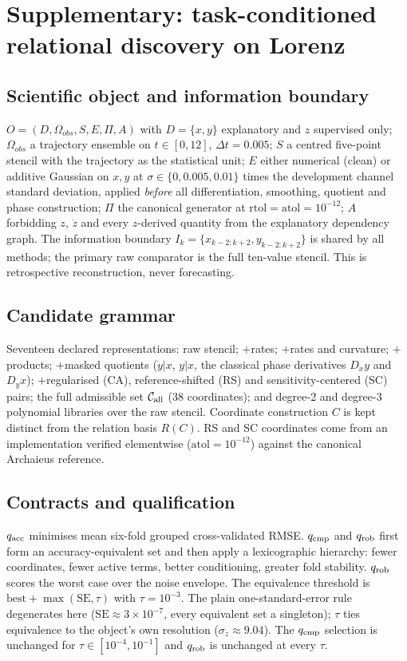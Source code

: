 
\section{Supplementary: task-conditioned relational discovery on Lorenz}

\subsection{Scientific object and information boundary}
$O=(D,\Omega_{obs},S,E,\Pi,A)$ with $D=\{x,y\}$ explanatory and $z$ supervised
only; $\Omega_{obs}$ a trajectory ensemble on $t\in[0,12]$, $\Delta t=0.005$;
$S$ a centred five-point stencil with the trajectory as the statistical unit;
$E$ either numerical (clean) or additive Gaussian on $x,y$ at
$\sigma\in\{0,0.005,0.01\}$ times the development channel standard deviation,
applied \emph{before} all differentiation, smoothing, quotient and phase
construction; $\Pi$ the canonical generator at $\mathrm{rtol}=\mathrm{atol}=10^{-12}$;
$A$ forbidding $z$, $\dot z$ and every $z$-derived quantity from the explanatory
dependency graph. The information boundary
$I_k=\{x_{k-2:k+2},y_{k-2:k+2}\}$ is shared by all methods; the primary raw
comparator is the full ten-value stencil. This is retrospective reconstruction,
never forecasting.

\subsection{Candidate grammar}
Seventeen declared representations: raw stencil; $+$rates; $+$rates and
curvature; $+$products; $+$masked quotients ($\dot y|x$, $y|x$, the classical
phase derivatives $D_x y$ and $D_y x$); $+$regularised (CA), reference-shifted
(RS) and sensitivity-centered (SC) pairs; the full admissible set
$\mathcal{C}_{\rm all}$ (38 coordinates); and degree-2 and degree-3 polynomial
libraries over the raw stencil. Coordinate construction $C$ is kept distinct
from the relation basis $R(C)$. RS and SC coordinates come from an
implementation verified elementwise ($\mathrm{atol}=10^{-12}$) against the
canonical Archaieus reference.

\subsection{Contracts and qualification}
$q_{\rm acc}$ minimises mean six-fold grouped cross-validated RMSE.
$q_{\rm cmp}$ and $q_{\rm rob}$ first form an accuracy-equivalent set and then
apply a lexicographic hierarchy: fewer coordinates, fewer active terms, better
conditioning, greater fold stability. $q_{\rm rob}$ scores the worst case over
the noise envelope. The equivalence threshold is
$\mathrm{best}+\max(\mathrm{SE},\tau)$ with $\tau=10^{-3}$. The plain
one-standard-error rule degenerates here ($\mathrm{SE}\approx3\times10^{-7}$,
every equivalent set a singleton); $\tau$ ties equivalence to the object's own
resolution ($\sigma_z\approx9.04$). The $q_{\rm cmp}$ selection is unchanged for
$\tau\in[10^{-4},10^{-1}]$ and $q_{\rm rob}$ is unchanged at every $\tau$.

